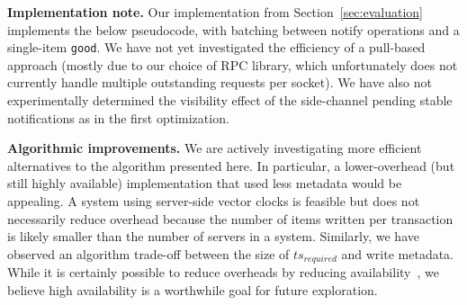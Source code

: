 \vspace{1em}\noindent\textbf{Implementation note.} Our implementation from Section~\ref{sec:evaluation} implements the below pseudocode, with batching between \textrm{notify} operations and a single-item \texttt{good}. We have not yet investigated the efficiency of a pull-based approach (mostly due to our choice of RPC library, which unfortunately does not currently handle multiple outstanding requests per socket). We have also not experimentally determined the visibility effect of the side-channel pending stable notifications as in the first optimization.

\vspace{1em}\noindent\textbf{Algorithmic improvements.} We are actively investigating more efficient alternatives to the algorithm presented here. In particular, a lower-overhead (but still highly available) implementation that used less metadata would be appealing. A system using server-side vector clocks is feasible but does not necessarily reduce overhead because the number of items written per transaction is likely smaller than the number of servers in a system. Similarly, we have observed an algorithm trade-off between the size of $ts_{required}$ and write metadata. While it is certainly possible to reduce overheads by reducing availability~\cite{eiger}, we believe high availability is a worthwhile goal for future exploration.



